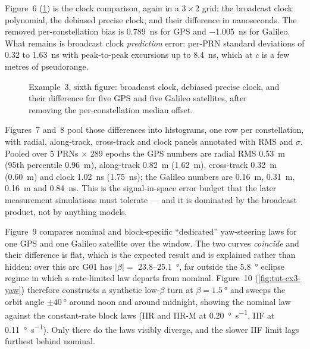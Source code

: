 Figure~6 (\cref{fig:tut-ex3-clk}) is the clock comparison, again in a
$3\times2$ grid: the broadcast clock polynomial, the debiased precise clock, and
their difference in nanoseconds. The removed per-constellation bias is
\SI{0.789}{\nano\second} for GPS and \SI{-1.005}{\nano\second} for Galileo. What
remains is broadcast clock \emph{prediction} error: per-PRN standard deviations
of 0.32 to \SI{1.63}{\nano\second} with peak-to-peak excursions up to
\SI{8.4}{\nano\second}, which at $c$ is a few metres of pseudorange.

\begin{figure}[htbp]
  \centering
  \caption{Example~3, sixth figure: broadcast clock, debiased precise clock, and
           their difference for five GPS and five Galileo satellites, after
           removing the per-constellation median offset.}
  \label{fig:tut-ex3-clk}
\end{figure}

Figures~7 and~8 pool those differences into histograms, one row per
constellation, with radial, along-track, cross-track and clock panels annotated
with RMS and $\sigma$. Pooled over 5 PRNs $\times$ 289 epochs the GPS numbers are
radial RMS \SI{0.53}{\meter} (95th percentile \SI{0.96}{\meter}), along-track
\SI{0.82}{\meter} (\SI{1.62}{\meter}), cross-track \SI{0.32}{\meter}
(\SI{0.60}{\meter}) and clock \SI{1.02}{\nano\second} (\SI{1.75}{\nano\second});
the Galileo numbers are \SI{0.16}{\meter}, \SI{0.31}{\meter}, \SI{0.16}{\meter}
and \SI{0.84}{\nano\second}. This is the signal-in-space error budget that the
later measurement simulations must tolerate --- and it is dominated by the
broadcast product, not by anything \lupnt{} models.

Figure~9 compares nominal and block-specific ``dedicated'' yaw-steering laws for
one GPS and one Galileo satellite over the window. The two curves \emph{coincide}
and their difference is flat, which is the expected result and is explained
rather than hidden: over this arc G01 has $|\beta| =$ 23.8--\SI{25.1}{\degree},
far outside the \SI{5.8}{\degree} eclipse regime in which a rate-limited law
departs from nominal. Figure~10 (\cref{fig:tut-ex3-yaw}) therefore constructs a
synthetic low-$\beta$ turn at $\beta=\SI{1.5}{\degree}$ and sweeps the orbit
angle $\pm\SI{40}{\degree}$ around noon and around midnight, showing the nominal
law against the constant-rate block laws (IIR and IIR-M at
\SI{0.20}{\degree\per\second}, IIF at \SI{0.11}{\degree\per\second}). Only there
do the laws visibly diverge, and the slower IIF limit lags furthest behind
nominal.

